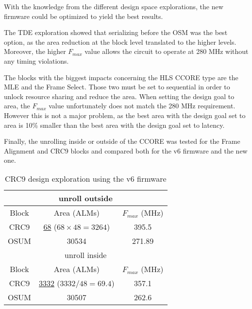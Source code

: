 With the knowledge from the different design space explorations, the new firmware could be optimized to yield the best results.

The TDE exploration showed that serializing before the OSM was the best option, as the area reduction at the block level translated to the higher levels. Moreover, the higher \(F_{max}\) value allows the circuit to operate at 280 MHz without any timing violations.

The blocks with the biggest impacts concerning the HLS CCORE type are the MLE and the Frame Select. Those two must be set to sequential in order to unlock resource sharing and reduce the area. When setting the design goal to area, the \(F_{max}\) value unfortunately does not match the 280 MHz requirement. However this is not a major problem, as the best area with the design goal set to area is 10\% smaller than the best area with the design goal set to latency.

Finally, the unrolling inside or outside of the CCORE was tested for the Frame Alignment and CRC9 blocks and compared both for the v6 firmware and the new one. 

\begin{table}[ht]
    \centering
    \begin{tabular}{|c|c|c|}
        \hline
        \hline
        \multicolumn{3}{|c|}{unroll outside} \\
        \hline
        Block & Area (ALMs) & \(F_{max}\) (MHz) \\
        \hline
        CRC9 & \underline{68} (\(68\times48=3264\)) & 395.5 \\
        OSUM & 30534 & 271.89 \\
        \hline
        \hline
        \multicolumn{3}{|c|}{unroll inside} \\
        \hline
        Block & Area (ALMs) & \(F_{max}\) (MHz) \\
        \hline
        CRC9 & \underline{3332} (\(3332/48=69.4\))& 357.1\\
        OSUM & 30507 & 262.6\\
        \hline
    \end{tabular}
    \caption{CRC9 design exploration using the v6 firmware}
    \label{tab:crc9-optimization}
\end{table}
